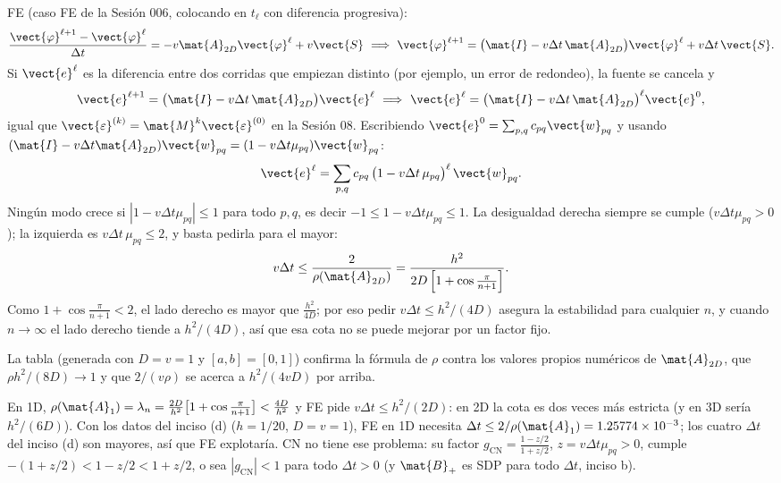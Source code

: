 FE (caso FE de la Sesión 006, colocando en $t_\ell$ con diferencia progresiva):
\[
  \frac{\vect{\varphi}^{\ell+1} - \vect{\varphi}^\ell}{\Delta t} = -v\mat{A}_{2D}\vect{\varphi}^\ell + v\vect{S}
  \ \Longrightarrow\
  \vect{\varphi}^{\ell+1} = \big(\mat{I} - v\Delta t\,\mat{A}_{2D}\big)\vect{\varphi}^\ell + v\Delta t\,\vect{S}.
\]
Si $\vect{e}^\ell$ es la diferencia entre dos corridas que empiezan distinto (por ejemplo, un error de redondeo),
la fuente se cancela y
\[
  \vect{e}^{\ell+1} = \big(\mat{I} - v\Delta t\,\mat{A}_{2D}\big)\vect{e}^\ell
  \ \Longrightarrow\ \vect{e}^\ell = \big(\mat{I} - v\Delta t\,\mat{A}_{2D}\big)^\ell\vect{e}^0,
\]
igual que $\vect{\varepsilon}^{(k)} = \mat{M}^k\vect{\varepsilon}^{(0)}$ en la Sesión 08. Escribiendo
$\vect{e}^0 = \sum_{p,q} c_{pq}\vect{w}_{pq}$ y usando $(\mat{I} - v\Delta t\mat{A}_{2D})\vect{w}_{pq} = (1 - v\Delta t\mu_{pq})\vect{w}_{pq}$:
\[
  \vect{e}^\ell = \sum_{p,q} c_{pq}\,\big(1 - v\Delta t\,\mu_{pq}\big)^\ell\,\vect{w}_{pq}.
\]
Ningún modo crece si $|1 - v\Delta t\mu_{pq}|\le1$ para todo $p, q$, es decir
$-1\le 1 - v\Delta t\mu_{pq}\le 1$. La desigualdad derecha siempre se cumple ($v\Delta t\mu_{pq} > 0$); la
izquierda es $v\Delta t\,\mu_{pq}\le 2$, y basta pedirla para el mayor:
\[
  v\Delta t \le \frac{2}{\rho(\mat{A}_{2D})} = \frac{h^2}{2D\left[1 + \cos\frac{\pi}{n+1}\right]} .
\]
Como $1 + \cos\frac{\pi}{n+1} < 2$, el lado derecho es mayor que $\frac{h^2}{4D}$; por eso pedir
$v\Delta t\le h^2/(4D)$ asegura la estabilidad para cualquier $n$, y cuando $n\to\infty$ el lado derecho tiende
a $h^2/(4D)$, así que esa cota no se puede mejorar por un factor fijo.

\begin{center}
\end{center}
La tabla (generada con $D = v = 1$ y $[a, b] = [0, 1]$) confirma la fórmula de $\rho$ contra los valores
propios numéricos de $\mat{A}_{2D}$, que $\rho h^2/(8D)\to1$ y que $2/(v\rho)$ se acerca a $h^2/(4vD)$ por arriba.

\begin{ojo}
En 1D, $\rho(\mat{A}_1) = \lambda_n = \frac{2D}{h^2}\big[1 + \cos\frac{\pi}{n+1}\big] < \frac{4D}{h^2}$ y FE pide
$v\Delta t\le h^2/(2D)$: en 2D la cota es dos veces más estricta (y en 3D sería $h^2/(6D)$). Con los datos
del inciso (d) ($h = 1/20$, $D = v = 1$), FE en 1D necesita $\Delta t\le 2/\rho(\mat{A}_1) = 1.25774\times10^{-3}$;
los cuatro $\Delta t$ del inciso (d) son mayores, así que FE explotaría. CN no tiene ese problema: su factor
$g_{\mathrm{CN}} = \frac{1 - z/2}{1 + z/2}$, $z = v\Delta t\mu_{pq} > 0$, cumple $-(1 + z/2) < 1 - z/2 < 1 + z/2$,
o sea $|g_{\mathrm{CN}}| < 1$ para todo $\Delta t > 0$ (y $\mat{B}_+$ es SDP para todo $\Delta t$, inciso b).
\end{ojo}

